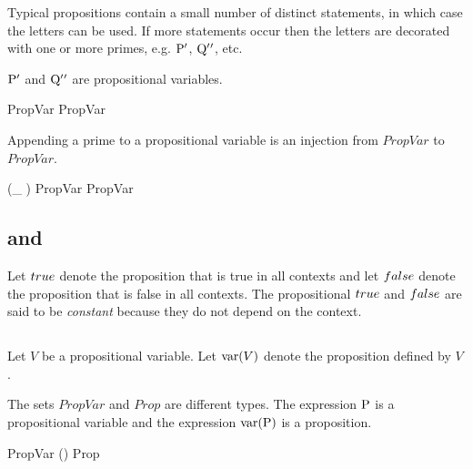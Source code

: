 \documentclass[11pt, oneside]{article}
\begin{document}
Typical propositions contain a small number of distinct statements, in which case the letters can be used.
If more statements occur then the letters are decorated with one or more primes, 
e.g. $\mathrm{P} {'}$, $\mathrm{Q} {'} {'}$, etc.

\begin{example}
$\mathrm{P} {'}$ and $\mathrm{Q} {'} {'}$ are propositional variables.
\begin{zed}
	\propP \propPrime \in PropVar
\also
	\propQ \propPrime \propPrime \in PropVar
\end{zed}

\end{example}

\begin{remark}
Appending a prime to a propositional variable is an injection from $PropVar$ to $PropVar$.

\begin{zed}
	(\_ \propPrime) \in PropVar \inj PropVar
\end{zed}

\end{remark}

\subsection{ and }

Let $true$ denote the proposition that is true in all contexts and
let $false$ denote the proposition that is false in all contexts.
The propositional $true$ and $false$ are said to be {\it constant} because they do not
depend on the context.

\subsection{}

Let $V$ be a propositional variable.
Let $\operatorname{var}(V)$ denote the proposition defined by $V$.

\begin{remark}
The sets $PropVar$ and $Prop$ are different types.
The expression $\mathrm{P}$ is a propositional variable and the expression $\operatorname{var}(\mathrm{P})$ is a proposition.

\begin{zed}
	\propP \in PropVar
\also
	\varProp(\propP) \in Prop
\end{zed}

\end{remark}
\end{document}

